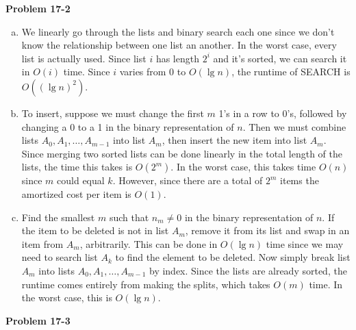 \documentclass{article}
\begin{document}
\noindent\textbf{Problem 17-2}\\
\begin{enumerate}[a.]
\item We linearly go through the lists and binary search each one since we don't know the relationship between one list an another.  In the worst case, every list is actually used.  Since list $i$ has length $2^i$ and it's sorted, we can search it in $O(i)$ time.  Since $i$ varies from 0 to $O(\lg n)$, the runtime of SEARCH is $O((\lg n)^2)$. \\

\item To insert, suppose we must change the first $m$ 1's in a row to 0's, followed by changing a 0 to a 1 in the binary representation of $n$.  Then we must combine lists $A_0, A_1, \ldots, A_{m-1}$ into list $A_m$, then insert the new item into list $A_m$.  Since merging two sorted lists can be done linearly in the total length of the lists, the time this takes is $O(2^m)$.  In the worst case, this takes time $O(n)$ since $m$ could equal $k$.  However, since there are a total of $2^m$ items the amortized cost per item is $O(1)$. \\

\item Find the smallest $m$ such that $n_m \neq 0$ in the binary representation of $n$.  If the item to be deleted is not in list $A_m$, remove it from its list and swap in an item from $A_m$, arbitrarily.  This can be done in $O(\lg n)$ time since we may need to search list $A_k$ to find the element to be deleted.  Now simply break list $A_m$ into lists $A_0, A_1, \ldots, A_{m-1}$ by index.  Since the lists are already sorted, the runtime comes entirely from making the splits, which takes $O(m)$ time.  In the worst case, this is $O(\lg n)$. \\
\end{enumerate}
\noindent\textbf{Problem 17-3}\\
\end{document}
